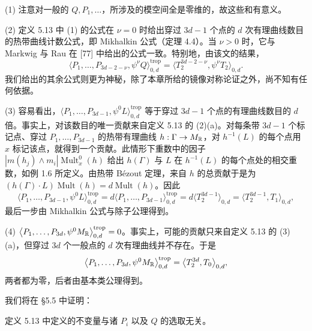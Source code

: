 \begin{remark}
(1) 注意对一般的 $Q,P_1,\ldots$，所涉及的模空间全是零维的，故这些和有意义。

(2) 定义 5.13 中 (1) 的公式在 $\nu=0$ 时给出穿过 $3d-1$ 个点的 $d$ 次有理曲线数目的热带曲线计数公式，即 Mikhalkin 公式（定理 4.4）。当 $\nu>0$ 时，它与 Markwig 与 Rau 在 [77] 中给出的公式一致。特别地，由该文的结果，
\[
  \bigl\langle P_1,\ldots,P_{3d-2-\nu},\psi^\nu Q\bigr\rangle^{\mathrm{trop}}_{0,d}
  =\bigl\langle T_2^{3d-2-\nu},\psi^\nu T_2\bigr\rangle_{0,d}.
\]
我们给出的其余公式则更为神秘，除了本章所给的镜像对称论证之外，尚不知有任何依据。

(3) 容易看出，$\bigl\langle P_1,\ldots,P_{3d-1},\psi^0L\bigr\rangle^{\mathrm{trop}}_{0,d}$ 等于穿过 $3d-1$ 个点的有理曲线数目的 $d$ 倍。事实上，对该数目的唯一贡献来自定义 5.13 的 (2)(a)。对每条带 $3d-1$ 个标记点、穿过 $P_1,\ldots,P_{3d-1}$ 的热带有理曲线 $h:\Gamma\to M_{\mathbb{R}}$，对 $h^{-1}(L)$ 的每个点用 $x$ 标记该点，就得到一个贡献。此情形下重数中的因子 $|m(h_j)\wedge m_i|\operatorname{Mult}^0_x(h)$ 给出 $h(\Gamma)$ 与 $L$ 在 $h^{-1}(L)$ 的每个点处的相交重数，如例 1.6 所定义。由热带 Bézout 定理，来自 $h$ 的总贡献于是为 $(h(\Gamma)\cdot L)\operatorname{Mult}(h)=d\operatorname{Mult}(h)$。因此
\[
  \bigl\langle P_1,\ldots,P_{3d-1},\psi^0L\bigr\rangle^{\mathrm{trop}}_{0,d}
  =d\bigl\langle P_1,\ldots,P_{3d-1}\bigr\rangle^{\mathrm{trop}}_{0,d}
  =d\bigl\langle T_2^{3d-1}\bigr\rangle_{0,d}
  =\bigl\langle T_2^{3d-1},T_1\bigr\rangle_{0,d},
\]
最后一步由 Mikhalkin 公式与除子公理得到。

(4) $\bigl\langle P_1,\ldots,P_{3d},\psi^0M_{\mathbb{R}}\bigr\rangle^{\mathrm{trop}}_{0,d}=0$。事实上，可能的贡献只来自定义 5.13 的 (3)(a)，但穿过 $3d$ 个一般点的 $d$ 次有理曲线并不存在。于是
\[
  \bigl\langle P_1,\ldots,P_{3d},\psi^0M_{\mathbb{R}}\bigr\rangle^{\mathrm{trop}}_{0,d}
  =\bigl\langle T_2^{3d},T_0\bigr\rangle_{0,d},
\]
两者都为零，后者由基本类公理得到。
\end{remark}

我们将在 §5.5 中证明：

\begin{theorem}
定义 5.13 中定义的不变量与诸 $P_i$ 以及 $Q$ 的选取无关。
\end{theorem}


